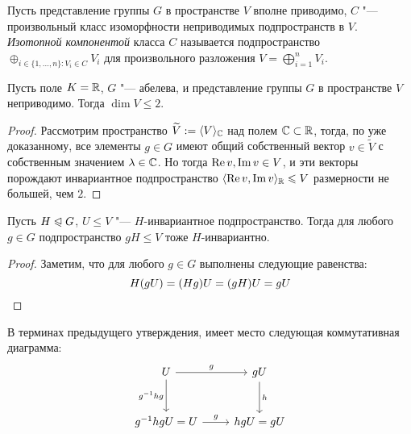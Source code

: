 \begin{definition}
	Пусть представление группы $G$ в пространстве $V$ вполне приводимо, $C$ "--- произвольный класс изоморфности неприводимых подпространств в $V$. \textit{Изотопной компонентой} класса $C$ называется подпространство $\oplus_{i \in \{1, \dotsc, n\} : V_i \in C}V_i$ для произвольного разложения $V = \bigoplus_{i = 1}^nV_i$.
\end{definition}

\begin{proposition}
	Пусть поле $K = \mathbb{R}$, $G$ "--- абелева, и представление группы $G$ в пространстве $V$ неприводимо. Тогда $\dim {V} \le 2$.
\end{proposition}

\begin{proof}
	Рассмотрим пространство $\widetilde V := \langle V\rangle_{\mathbb{C}}$ над полем $\mathbb{C} \subset \mathbb{R}$, тогда, по уже доказанному, все элементы $g \in G$ имеют общий собственный вектор $v \in \widetilde V$ с собственным значением $\lambda \in \mathbb{C}$. Но тогда $\operatorname{Re}{v}, \operatorname{Im}{v} \in V$, и эти векторы порождают инвариантное подпространство $\langle \operatorname{Re}{v}, \operatorname{Im}{v}\rangle_{\mathbb{R}} \leqslant V$ размерности не большей, чем $2$.
\end{proof}

\begin{proposition}
	Пусть $H \trianglelefteqslant G$, $U \le V$ "--- $H$-инвариантное подпространство. Тогда для любого $g \in G$ подпространство $gH \le V$ тоже $H$-инвариантно.
\end{proposition}

\begin{proof}
	Заметим, что для любого $g \in G$ выполнены следующие равенства:
	\[H(gU) = (Hg)U = (gH)U = gU\qedhere\]
\end{proof}

\begin{note}
	В терминах предыдущего утверждения, имеет место следующая коммутативная диаграмма:
	\[
	\begin{tikzcd}[row sep = large]
		U \arrow[swap]{d}{g^{-1}hg} \arrow{r}{g} & gU \arrow{d}{h}\\
		g^{-1}hgU = U \arrow{r}{g} & hgU = gU
	\end{tikzcd}
	\]
\end{note}